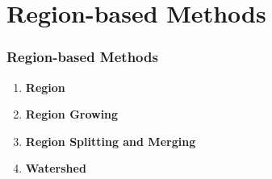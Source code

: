 \documentclass[notheorems,mathserif,table,compress]{beamer}  %
\begin{document}

\section{Region-based Methods}
\begin{frame}
    \frametitle{Region-based Methods}
    \begin{enumerate}
    \item \textbf{\Large Region} \newline
    \item \textbf{\Large Region Growing}\newline
    \item \textbf{\Large Region Splitting and Merging} \newline
    \item \textbf{\Large Watershed} \newline
    \end{enumerate}
\end{frame}
\end{document}
